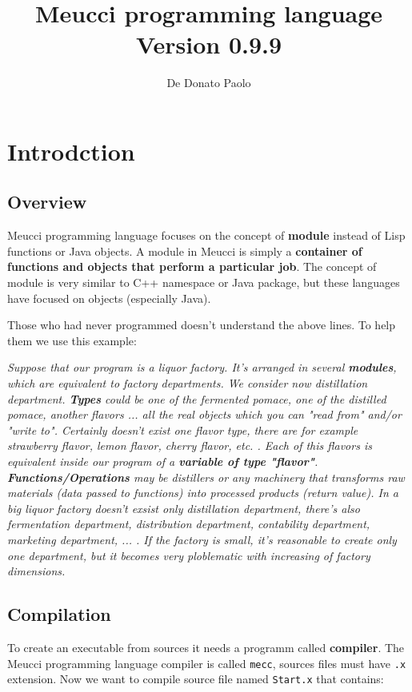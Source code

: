 \documentclass[10pt]{book}%
\author{De Donato Paolo}
\title{\textbf{\huge Meucci programming language\\
\large Version 0.9.9}}
\date{}
\newcommand{\code}[1]{\texttt{#1}}
\renewcommand{\emph}[1]{\textbf{#1}}
\begin{document}
\maketitle
\tableofcontents
\chapter{Introdction}
\section{Overview}
Meucci programming language focuses on the concept of \emph{module} instead of Lisp functions or Java objects. A module in Meucci is simply a \emph{container of functions and objects that perform a particular job}. The concept of module is very similar to C++ namespace or Java package, but these languages have focused on objects (especially Java).

Those who had never programmed doesn't understand the above lines. To help them we use this example:

\textit{Suppose that our program is a liquor factory. It's arranged in several \textbf{modules}, which are equivalent to factory departments. We consider now distillation department. \textbf{Types} could be one of the fermented pomace, one of the distilled pomace, another flavors ... all the real objects which you can "read from" and/or "write to". Certainly doesn't exist one flavor type, there are for example strawberry flavor, lemon flavor, cherry flavor, etc. . Each of this flavors is equivalent inside our program of a \textbf{variable of type "flavor"}. \textbf{Functions/Operations} may be distillers or any machinery that transforms raw materials (data passed to functions) into processed products (return value). In a big liquor factory doesn't exsist only distillation department, there's also fermentation department, distribution department, contability department, marketing department, ... . If the factory is small, it's reasonable to create only one department, but it becomes very ploblematic with increasing of factory dimensions.}

\section{Compilation}
To create an executable from sources it needs a programm called \emph{compiler}. The Meucci programming language compiler is called \code{mecc}, sources files must have \code{.x} extension. Now we want to compile source file named \code{Start.x} that contains:
\end{document}
